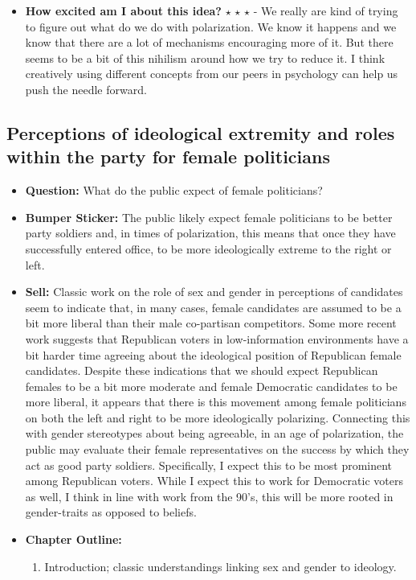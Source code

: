 \documentclass[12pt]{article}
\begin{document}
\begin{itemize}
        \item \textbf{How excited am I about this idea?} $\star$ $\star$ $\star$ - We really are kind of trying to figure out what do we do with polarization. We know it happens and we know that there are a lot of mechanisms encouraging more of it. But there seems to be a bit of this nihilism around how we try to reduce it. I think creatively using different concepts from our peers in psychology can help us push the needle forward.
    \end{itemize}
\subsection{Perceptions of ideological extremity and roles within the party for female politicians}
    \begin{itemize}
        \item \textbf{Question:} What do the public expect of female politicians?
        \item \textbf{Bumper Sticker:} The public likely expect female politicians to be better party soldiers and, in times of polarization, this means that once they have successfully entered office, to be more ideologically extreme to the right or left.
        \item \textbf{Sell:} Classic work on the role of sex and gender in perceptions of candidates seem to indicate that, in many cases, female candidates are assumed to be a bit more liberal than their male co-partisan competitors. Some more recent work suggests that Republican voters in low-information environments have a bit harder time agreeing about the ideological position of Republican female candidates. Despite these indications that we should expect Republican females to be a bit more moderate and female Democratic candidates to be more liberal, it appears that there is this movement among female politicians on both the left and right to be more ideologically polarizing. Connecting this with gender stereotypes about being agreeable, in an age of polarization, the public may evaluate their female representatives on the success by which they act as good party soldiers. Specifically, I expect this to be most prominent among Republican voters. While I expect this to work for Democratic voters as well, I think in line with work from the 90's, this will be more rooted in gender-traits as opposed to beliefs.
        \item \textbf{Chapter Outline:}
        \begin{enumerate}
            \item Introduction; classic understandings linking sex and gender to ideology.

\end{enumerate}
\end{itemize}
\end{document}
